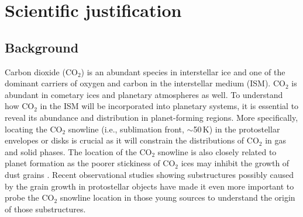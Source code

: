 \documentclass[12pt,a4paper]{article}  %
\newcommand{\carbondioxide}{CO$_2$\xspace}
\begin{document}
\pagestyle{plain}
 



\section{Scientific justification}

\subsection{Background}

Carbon dioxide (\carbondioxide) is an abundant species in interstellar ice and one of the dominant carriers of oxygen and carbon in the interstellar medium (ISM). \carbondioxide is abundant in cometary ices and planetary atmospheres as well. To understand how \carbondioxide in the ISM will be incorporated into planetary systems, it is essential to reveal its abundance and distribution in planet-forming regions. More specifically, locating the \carbondioxide snowline (i.e., sublimation front, $\sim$50\,K) in the protostellar envelopes or disks is crucial as it will constrain the distributions of \carbondioxide in gas and solid phases. The location of the \carbondioxide snowline is also closely related to planet formation as the poorer stickiness of \carbondioxide ices may inhibit the growth of dust grains \citep[e.g.,][]{Okuzumi19}. Recent observational studies showing substructures possibly caused by the grain growth in protostellar objects \citep[e.g.,][]{Sheehan20, Ohashi21} have made it even more important to probe the \carbondioxide snowline location in those young sources to understand the origin of those substructures.


\end{document}
